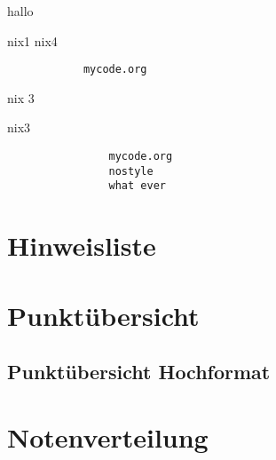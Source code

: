\documentclass[a4paper,12pt]{scrartcl}
\begin{document}
    \begin{aufgabe*}[points=5, bonus-points=2,subtitle={Mein Titel}]
        hallo
        \begin{teilaufgaben}
            \teilaufgabe nix1
            \teilaufgabe nix4
        \end{teilaufgaben}

        \begin{lstlisting}
            mycode.org
        \end{lstlisting}

        \begin{loesung*}
            nix 3
            \begin{teilaufgaben}
                \teilaufgabe nix3
            \end{teilaufgaben}

            \begin{lstlisting}
                mycode.org
                nostyle
                what ever
            \end{lstlisting}
        \end{loesung*}
    \end{aufgabe*}

    \section*{Hinweisliste}
        \bearbeitungshinweisliste

    \section*{Punktübersicht}

        \punktuebersicht

    \subsection*{Punktübersicht Hochformat}
        \punktuebersicht[default]

    \section*{Notenverteilung}
        \notenverteilung
\end{document}
